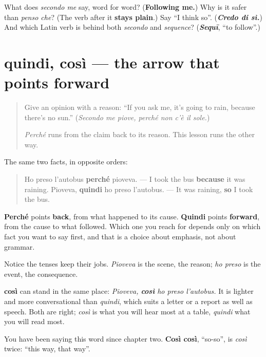 \begin{tcolorbox}[breakable,colback=teal!4,colframe=teal!35!black,title={Before you move on}]
What does \emph{secondo me} say, word for word? (\textbf{Following me.}) Why is it safer than \emph{penso che}? (The verb after it \textbf{stays plain}.) Say \textquotedblleft{}I think so\textquotedblright{}. (\emph{\textbf{Credo di sì.}}) And which Latin verb is behind both \emph{secondo} and \emph{sequence}? (\emph{\textbf{Sequī}}, \textquotedblleft{}to follow\textquotedblright{}.)
\end{tcolorbox}
\section[quindi, così]{quindi, così — the arrow that points forward}

\label{lesson:IT-C265-cosi}



\begin{quote}
Give an opinion with a reason: \textquotedblleft{}If you ask me, it's going to rain, because there's no sun.\textquotedblright{} (\emph{Secondo me piove, perché non c'è il sole.})

\emph{Perché} runs from the claim back to its reason. This lesson runs the other way.
\end{quote}

\begin{grammarlens}[title={Grammar Lens: the two arrows}]
The same two facts, in opposite orders:

\begin{quote}
Ho preso l'autobus \textbf{perché} pioveva. — I took the bus \textbf{because} it was raining. Pioveva, \textbf{quindi} ho preso l'autobus. — It was raining, \textbf{so} I took the bus.
\end{quote}

\textbf{Perché} points \textbf{back}, from what happened to its cause. \textbf{Quindi} points \textbf{forward}, from the cause to what followed. Which one you reach for depends only on which fact you want to say first, and that is a choice about emphasis, not about grammar.

Notice the tenses keep their jobs. \emph{Pioveva} is the scene, the reason; \emph{ho preso} is the event, the consequence.
\end{grammarlens}

\begin{grammarlens}[title={Grammar Lens: così, the spoken so}]
\textbf{così} can stand in the same place: \emph{Pioveva, \textbf{così} ho preso l'autobus.} It is lighter and more conversational than \emph{quindi}, which suits a letter or a report as well as speech. Both are right; \emph{così} is what you will hear most at a table, \emph{quindi} what you will read most.

You have been saying this word since chapter two. \textbf{Così così}, \textquotedblleft{}so-so\textquotedblright{}, is \emph{così} twice: \textquotedblleft{}this way, that way\textquotedblright{}.
\end{grammarlens}

